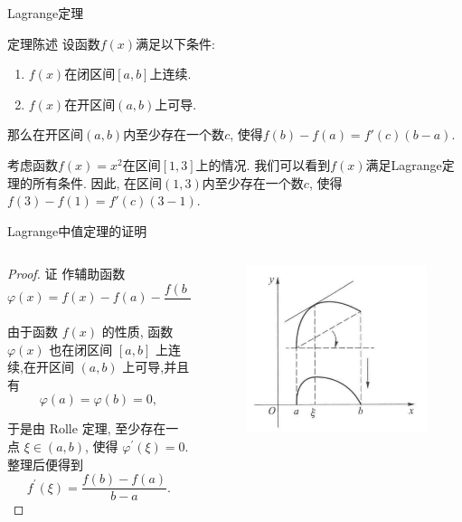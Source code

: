 \documentclass[
10pt,
aspectratio=43,
]{beamer}
\begin{document}
\begin{frame}{Lagrange定理}
	\begin{block}{定理陈述}
		设函数$f(x)$满足以下条件:
		\begin{enumerate}
			\item $f(x)$在闭区间$[a, b]$上连续.
			\item $f(x)$在开区间$(a, b)$上可导.
		\end{enumerate}
		那么在开区间$(a, b)$内至少存在一个数$c$, 使得$f(b) - f(a) = f'(c)(b - a)$.
	\end{block}

	\pause

	\begin{example}
		考虑函数$f(x) = x^2$在区间$[1, 3]$上的情况. 我们可以看到$f(x)$满足Lagrange定理的所有条件. 因此, 在区间$(1, 3)$内至少存在一个数$c$, 使得$f(3) - f(1) = f'(c)(3 - 1)$.
	\end{example}
\end{frame}

\begin{frame}[t]{Lagrange中值定理的证明} \begin{columns}[onlytextwidth] \begin{column}{0.6\textwidth} \begin{proof} 证 作辅助函数 
	$$ \varphi(x)=f(x)-f(a)-\frac{f(b)-f(a)}{b-a}(x-a), $$

				由于函数 $f(x)$ 的性质, 函数 $\varphi(x)$ 也在闭区间 $[a, b]$ 上连续,在开区间 $(a, b)$ 上可导,并且有
				$$
					\varphi(a)=\varphi(b)=0,
				$$

				于是由 Rolle 定理, 至少存在一点 $\xi \in(a, b)$, 使得 $\varphi^{\prime}(\xi)=0$. 整理后便得到
				$$
					f^{\prime}(\xi)=\frac{f(b)-f(a)}{b-a} .
				$$
			\end{proof}
		\end{column}
		\begin{column}{0.4\textwidth}
			\begin{figure}
				\includegraphics[width=0.88\linewidth]{phi-function.png}
			\end{figure}
		\end{column}
	\end{columns}
\end{frame}
\end{document}
